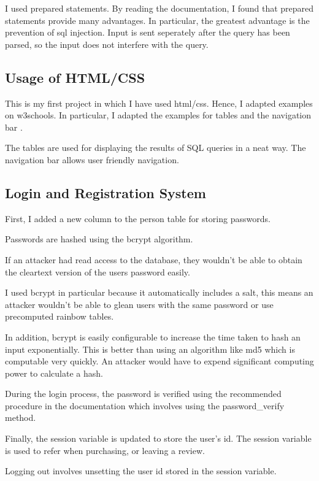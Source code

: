 \documentclass{article}
\begin{document}
I used prepared statements. By reading the documentation, I found that prepared statements provide many advantages. In particular, the greatest advantage is the prevention of sql injection. Input is sent seperately after the query has been parsed, so the input does not interfere with the query. 

\subsection{Usage of HTML/CSS}

This is my first project in which I have used html/css. Hence, I adapted examples on w3schools. In particular, I adapted the examples for tables \cite{w3-schools-tables} and the navigation bar \cite{w3-schools-navigation}.

The tables are used for displaying the results of SQL queries in a neat way. The navigation bar allows user friendly navigation.

\subsection{Login and Registration System}

First, I added a new column to the person table for storing passwords.

Passwords are hashed using the bcrypt algorithm.

If an attacker had read access to the database, they wouldn't be able to obtain the cleartext version of the users password easily. 

I used bcrypt in particular because it automatically includes a salt, this means an attacker wouldn't be able to glean users with the same password or use precomputed rainbow tables.

In addition, bcrypt is easily configurable to increase the time taken to hash an input exponentially. This is better than using an algorithm like md5 which is computable very quickly. An attacker would have to expend significant computing power to calculate a hash.

During the login process, the password is verified using the recommended procedure in the documentation which involves using the password\_verify method.

Finally, the session variable is updated to store the user's id. The session variable is used to refer when purchasing, or leaving a review.

Logging out involves unsetting the user id stored in the session variable.
\end{document}
